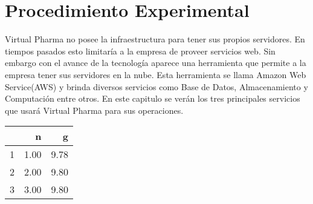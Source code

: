 \section*{Procedimiento Experimental}\label{sec:Procedimiento Experimental}

Virtual Pharma no posee la infraestructura para tener sus propios servidores. En tiempos pasados esto limitaría a la empresa de proveer servicios web. Sin embargo con el avance de la tecnología aparece una herramienta que permite a la empresa tener sus servidores en la nube. Esta herramienta se llama Amazon Web Service(AWS) y brinda diversos servicios como Base de Datos, Almacenamiento y Computación entre otros. En este capitulo se verán los tres principales servicios que usará Virtual Pharma para sus operaciones.
\begin{table}[ht]
\centering
\begin{tabular}{rrr}
  \hline
 & n & g \\ 
  \hline
1 & 1.00 & 9.78 \\ 
  2 & 2.00 & 9.80 \\ 
  3 & 3.00 & 9.80 \\ 
   \hline
\end{tabular}
\end{table}